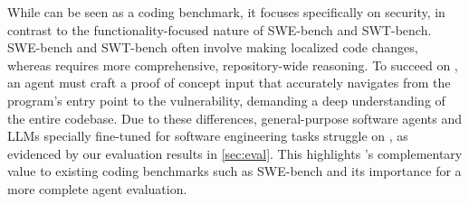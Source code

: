 While \sysname can be seen as a coding benchmark, it focuses specifically on security, in contrast to the functionality-focused nature of SWE-bench and SWT-bench.
SWE-bench and SWT-bench often involve making localized code changes, whereas \sysname requires more comprehensive, repository-wide reasoning.
To succeed on \sysname, an agent must craft a proof of concept input that accurately navigates from the program's entry point to the vulnerability, demanding a deep understanding of the entire codebase.
Due to these differences, general-purpose software agents and LLMs specially fine-tuned for software engineering tasks struggle on \sysname, as evidenced by our evaluation results in \cref{sec:eval}.
This highlights \sysname's complementary value to existing coding benchmarks such as SWE-bench and its importance for a more complete agent evaluation.
